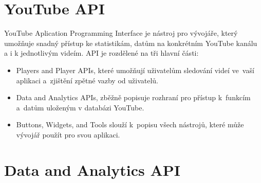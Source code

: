 \section{YouTube API}
\par YouTube Aplication Programming Interface\cite{apistart} je nástroj pro vývojáře, který umožňuje snadný přístup ke statistikám, datům na konkrétním YouTube kanálu a i k jednotlivým videím. API je rozdělené na tři hlavní části:
\begin{itemize}
	\item{Players and Player APIs, které umožňují uživatelům sledování videí ve~vaší aplikaci a~zjištění zpětné vazby od uživatelů.}
	\item{Data and Analytics APIs, zběžně popisuje rozhraní pro přístup k~funkcím a~datům uloženým v databázi YouTube.}
	\item{Buttons, Widgets, and Tools slouží k~popisu všech nástrojů, které může vývojář použít pro svou aplikaci.}
\end{itemize}

\section{Data and Analytics API}
